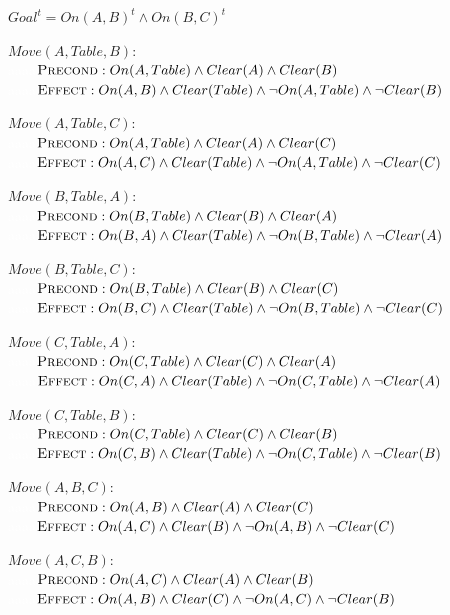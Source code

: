 \documentclass{article}
\begin{document}
\begin{enumerate}
$Goal^t = On(A,B)^t \land On(B,C)^t$

$Move(A,Table,B):$ \\
\textcolor{white}{aaaa}$\textsc{Precond}:On(A,Table) \land Clear(A) \land Clear(B)$ \\
\textcolor{white}{aaaa}$\textsc{Effect}:On(A,B) \land Clear(Table) \land \neg On(A,Table) \land \neg Clear(B)$

$Move(A,Table,C):$ \\
\textcolor{white}{aaaa}$\textsc{Precond}:On(A,Table) \land Clear(A) \land Clear(C)$ \\
\textcolor{white}{aaaa}$\textsc{Effect}:On(A,C) \land Clear(Table) \land \neg On(A,Table) \land \neg Clear(C)$

$Move(B,Table,A):$ \\
\textcolor{white}{aaaa}$\textsc{Precond}:On(B,Table) \land Clear(B) \land Clear(A)$ \\
\textcolor{white}{aaaa}$\textsc{Effect}:On(B,A) \land Clear(Table) \land \neg On(B,Table) \land \neg Clear(A)$

$Move(B,Table,C):$ \\
\textcolor{white}{aaaa}$\textsc{Precond}:On(B,Table) \land Clear(B) \land Clear(C)$ \\
\textcolor{white}{aaaa}$\textsc{Effect}:On(B,C) \land Clear(Table) \land \neg On(B,Table) \land \neg Clear(C)$

$Move(C,Table,A):$ \\
\textcolor{white}{aaaa}$\textsc{Precond}:On(C,Table) \land Clear(C) \land Clear(A)$ \\
\textcolor{white}{aaaa}$\textsc{Effect}:On(C,A) \land Clear(Table) \land \neg On(C,Table) \land \neg Clear(A)$

$Move(C,Table,B):$ \\
\textcolor{white}{aaaa}$\textsc{Precond}:On(C,Table) \land Clear(C) \land Clear(B)$ \\
\textcolor{white}{aaaa}$\textsc{Effect}:On(C,B) \land Clear(Table) \land \neg On(C,Table) \land \neg Clear(B)$

$Move(A,B,C):$ \\
\textcolor{white}{aaaa}$\textsc{Precond}:On(A,B) \land Clear(A) \land Clear(C)$ \\
\textcolor{white}{aaaa}$\textsc{Effect}:On(A,C) \land Clear(B) \land \neg On(A,B) \land \neg Clear(C)$

$Move(A,C,B):$ \\
\textcolor{white}{aaaa}$\textsc{Precond}:On(A,C) \land Clear(A) \land Clear(B)$ \\
\textcolor{white}{aaaa}$\textsc{Effect}:On(A,B) \land Clear(C) \land \neg On(A,C) \land \neg Clear(B)$


\end{enumerate}
\end{document}
